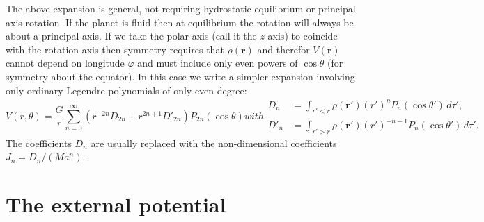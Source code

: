 \documentclass[amsmath,amsfonts,rmp,letterpaper]{revtex4}
\newcommand{\V}[1]{\mathbf{#1}} %
\newcommand{\arr}{\V{r}}
\newcommand{\arp}{\V{r'}}
\begin{document}
The above expansion is general, not requiring hydrostatic equilibrium or principal
axis rotation. If the planet is fluid then at equilibrium the rotation will
always be about a principal axis. If we take the polar axis (call it the $z$ axis)
to coincide with the rotation axis then symmetry requires that $\rho(\arr)$ and
therefor $V(\arr)$ cannot
depend on longitude $\varphi$ and must include only even
powers of $\cos\theta$ (for symmetry about the equator). In this case we write
a simpler expansion involving only ordinary Legendre polynomials of only even
degree:
\begin{subequations}\label{eq:simp_sphe_gravity}
\begin{equation}
V(r,\theta)=\frac{G}{r}\sum_{n=0}^{\infty}\left(r^{-2n}D_{2n} + r^{2n +
1}D'_{2n}\right)P_{2n}(\cos\theta)
\end{equation}
with
\begin{align}
D_n &= \int_{r'<r}\rho(\arp)(r')^nP_n(\cos\theta')\,d\tau',\\
D'_n &= \int_{r'>r}\rho(\arp)(r')^{-n-1}P_n(\cos\theta')\,d\tau'.
\end{align}
\end{subequations}
The coefficients $D_n$ are usually replaced with the non-dimensional coefficients
$J_n=D_n/(Ma^n)$.


\section{The external potential}\label{sec:external_potential}
\end{document}
